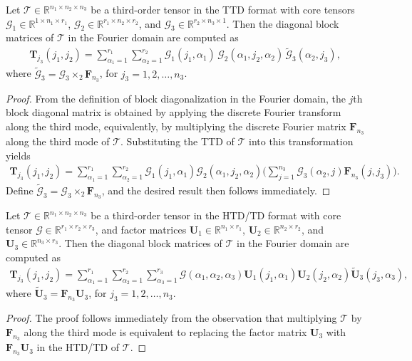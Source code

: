 \documentclass[onefignum,onetabnum]{siamart250211}
\begin{document}
\begin{proposition}\label{prop:ttdbd}
    Let $\mathscr{T}\in\mathbb{R}^{n_1\times n_2\times n_3}$ 
be a third-order tensor in the TTD format with core tensors
$\mathscr{G}_1\in\mathbb{R}^{1\times n_1\times r_1}$,
$\mathscr{G}_2\in\mathbb{R}^{r_1\times n_2\times r_2}$, and 
$\mathscr{G}_3\in\mathbb{R}^{r_2\times n_3\times 1}$. Then the diagonal block  matrices of $\mathscr{T}$ in the Fourier domain are computed as
\begin{align}\label{eq:ttdbd}
\textbf{T}_{j_3}(j_1,j_2)
= 
\sum_{\alpha_1=1}^{r_1}\sum_{\alpha_2=1}^{r_2} \mathscr{G}_1(j_1,\alpha_1)\, \mathscr{G}_2(\alpha_1,j_2,\alpha_2)\, \widetilde{\mathscr{G}}_3(\alpha_2,j_3), 
\end{align}
where $\widetilde{\mathscr{G}}_3 = \mathscr{G}_3 \times_2 \textbf{F}_{n_3}$, for $j_3=1,2,\dots, n_3$.
\end{proposition}
\begin{proof}
   From the definition of block diagonalization in the Fourier domain, the $j$th block diagonal matrix is obtained by applying the discrete Fourier transform along the third mode, equivalently, by multiplying the discrete Fourier matrix $\textbf{F}_{n_3}$ along the third mode of $\mathscr{T}$. Substituting the TTD of $\mathscr{T}$ into this transformation yields
    \begin{align*}
\textbf{T}_{j_3}(j_1,j_2)
=
\sum_{\alpha_1=1}^{r_1}
\sum_{\alpha_2=1}^{r_2}
\mathscr{G}_1(j_1,\alpha_1)
\mathscr{G}_2(\alpha_1,j_2,\alpha_2)
\Bigg(
\sum_{j=1}^{n_3}
\mathscr{G}_3(\alpha_2,j)
\textbf{F}_{n_3}(j,j_3)\Bigg).
\end{align*}
Define $\widetilde{\mathscr{G}}_3 = \mathscr{G}_3 \times_2 \textbf{F}_{n_3}$, and the desired result then follows immediately.
\end{proof}


\begin{proposition}\label{prop:htdbd}
    Let $\mathscr{T}\in\mathbb{R}^{n_1\times n_2\times n_3}$
be a third-order tensor in the HTD/TD format with core tensor
$\mathscr{G}\in\mathbb{R}^{r_1\times r_2\times r_3}$,
and factor matrices $\textbf{U}_1\in\mathbb{R}^{n_1\times r_1}$, $\textbf{U}_2\in\mathbb{R}^{n_2\times r_2}$, and $\textbf{U}_3\in\mathbb{R}^{n_3\times r_3}$. Then the diagonal block  matrices of $\mathscr{T}$ in the Fourier domain are computed as
\begin{align}\label{eq:htdbd}
\textbf{T}_{j_3}(j_1,j_2)
= 
\sum_{\alpha_1=1}^{r_1}\sum_{\alpha_2=1}^{r_2} \sum_{\alpha_3=1}^{r_3}\mathscr{G}(\alpha_1,\alpha_2,\alpha_3)\textbf{U}_1(j_1,\alpha_1)\textbf{U}_2(j_2,\alpha_2)\widetilde{\textbf{U}}_3(j_3,\alpha_3),
\end{align}
where $\widetilde{\textbf{U}}_3=\textbf{F}_{n_3}\textbf{U}_3$, for $j_3=1,2,\dots,n_3$.
\end{proposition}
\begin{proof}
The proof follows immediately from the observation that multiplying $\mathscr{T}$ by $\textbf{F}_{n_3}$ along the third mode is equivalent to replacing the factor matrix $\textbf{U}_3$ with $\textbf{F}_{n_3}\textbf{U}_3$ in the HTD/TD of $\mathscr{T}$.
\end{proof}
\end{document}
